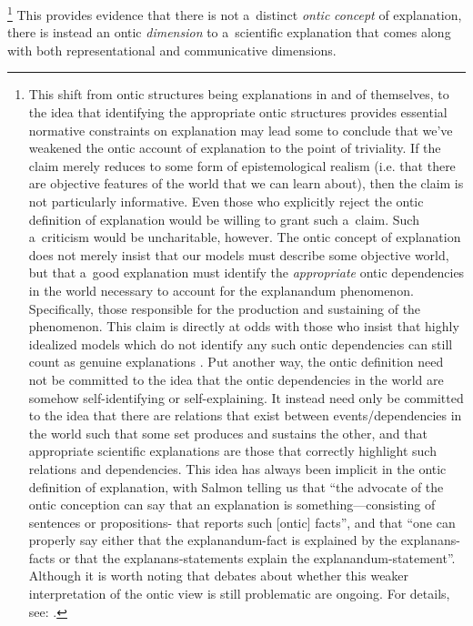 \footnote{This shift from ontic structures being explanations in and of themselves, to the idea that identifying the appropriate ontic structures provides essential normative constraints on explanation may lead some to conclude that we've weakened the ontic account of explanation to the point of triviality. If the claim merely reduces to some form of epistemological realism (i.e. that there are objective features of the world that we can learn about), then the claim is not particularly informative. Even those who explicitly reject the ontic definition of explanation would be willing to grant such a~claim. Such a~criticism would be uncharitable, however. The ontic concept of explanation does not merely insist that our models must describe some objective world, but that a~good explanation must identify the \textit{appropriate} ontic dependencies in the world necessary to account for the explanandum phenomenon. Specifically, those responsible for the production and sustaining of the phenomenon. This claim is directly at odds with those who insist that highly idealized models which do not identify any such ontic dependencies can still count as genuine explanations 
\parencites[e.g.][]{batterman_devil_2002}[][]{batterman_minimal_2014}[][]{chirimuuta_minimal_2014}[][]{rice_moving_2015}[][]{rice_how_2020}. %
 Put another way, the ontic definition need not be committed to the idea that the ontic dependencies in the world are somehow self-identifying or self-explaining. It instead need only be committed to the idea that there are relations that exist between events/dependencies in the world such that some set produces and sustains the other, and that appropriate scientific explanations are those that correctly highlight such relations and dependencies. This idea has always been implicit in the ontic definition of explanation, with Salmon 
\parencite*[][p.86]{salmon_four_1989} %
 telling us that ``the advocate of the ontic conception can say that an explanation is something---consisting of sentences or propositions- that reports such [ontic] facts'', and that ``one can properly say either that the explanandum-fact is explained by the explanans-facts or that the explanans-statements explain the explanandum-statement''. Although it is worth noting that debates about whether this weaker interpretation of the ontic view is still problematic are ongoing. For details, see: 
\parencites[][]{illari_mechanistic_2013}[][]{wright_ontic_2018}.%
} This provides evidence that there is not a~distinct \textit{ontic} \textit{concept} of explanation, there is instead an ontic \textit{dimension} to a~scientific explanation that comes along with both representational and communicative dimensions.

